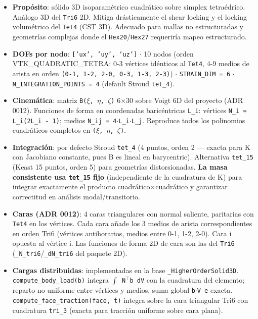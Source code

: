 \documentclass[11pt,letterpaper,oneside]{report}
\begin{document}
\begin{itemize}
  \item \textbf{Propósito}: sólido 3D isoparamétrico cuadrático sobre simplex tetraédrico. Análogo 3D del \texttt{Tri6} 2D. Mitiga drásticamente el shear locking y el locking volumétrico del \texttt{Tet4} (CST 3D). Adecuado para mallas no estructuradas y geometrías complejas donde el \texttt{Hex20}/\texttt{Hex27} requeriría mapeo estructurado.
  \item \textbf{DOFs por nodo}: \texttt{['ux', 'uy', 'uz']} \ensuremath{\cdot} 10 nodos (orden VTK\_QUADRATIC\_TETRA: 0-3 vértices idénticos al \texttt{Tet4}, 4-9 medios de arista en orden \texttt{(0-1, 1-2, 2-0, 0-3, 1-3, 2-3)}) \ensuremath{\cdot} \texttt{STRAIN\_DIM = 6} \ensuremath{\cdot} \texttt{N\_INTEGRATION\_POINTS = 4} (default Stroud \texttt{tet\_4}).
  \item \textbf{Cinemática}: matriz \texttt{B(\ensuremath{\xi}, \ensuremath{\eta}, \ensuremath{\zeta})} 6\ensuremath{\times}30 sobre Voigt 6D del proyecto (ADR 0012). Funciones de forma en coordenadas baricéntricas \texttt{L\_i}: vértices \texttt{N\_i = L\_i(2L\_i - 1)}; medios \texttt{N\_ij = 4\ensuremath{\cdot}L\_i\ensuremath{\cdot}L\_j}. Reproduce todos los polinomios cuadráticos completos en \texttt{(\ensuremath{\xi}, \ensuremath{\eta}, \ensuremath{\zeta})}.
  \item \textbf{Integración}: por defecto Stroud \texttt{tet\_4} (4 puntos, orden 2 --- exacta para K con Jacobiano constante, pues B es lineal en barycentric). Alternativa \texttt{tet\_15} (Keast 15 puntos, orden 5) para geometrías distorsionadas. \textbf{La masa consistente usa \texttt{tet\_15} fijo} (independiente de la cuadratura de K) para integrar exactamente el producto cuadrático\ensuremath{\times}cuadrático y garantizar correctitud en análisis modal/transitorio.
  \item \textbf{Caras (ADR 0012)}: 4 caras triangulares con normal saliente, paritarias con \texttt{Tet4} en los vértices. Cada cara añade los 3 medios de arista correspondientes en orden Tri6 (vértices antihorarios, medios entre 0-1, 1-2, 2-0). Cara i opuesta al vértice i. Las funciones de forma 2D de cara son las del \texttt{Tri6} (\texttt{\_N\_tri6}/\texttt{\_dN\_tri6} del paquete 2D).
  \item \textbf{Cargas distribuidas}: implementadas en la base \texttt{\_HigherOrderSolid3D}. \texttt{compute\_body\_load(b)} integra \texttt{\ensuremath{\int} N\ensuremath{^{\top}}b dV} con la cuadratura del elemento; reparto no uniforme entre vértices y medios, suma global \texttt{b\ensuremath{\cdot}V\_e} exacta. \texttt{compute\_face\_traction(face, t̄)} integra sobre la cara triangular Tri6 con cuadratura \texttt{tri\_3} (exacta para tracción uniforme sobre cara plana).

\end{itemize}
\end{document}
